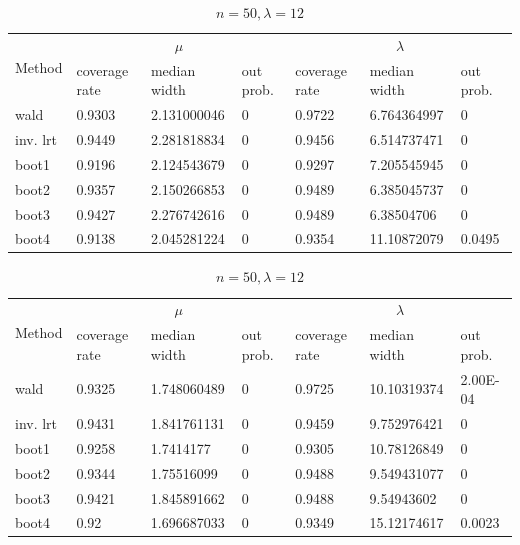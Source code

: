 \documentclass{article}
\begin{document}
       \begin{table}
       \ContinuedFloat
        \begin{subtable}[b]{\textwidth}
		\centering
		\begin{tabular}{l|lll|lll}
		\toprule
        \multirow{2}{*}{Method} & \multicolumn{3}{c|}{$\mu$}      & \multicolumn{3}{c}{$\lambda$}  \\ 
                           & coverage rate & median width & out prob. & coverage rate & median width & out prob. \\
                           \midrule
wald      & 0.9303	&2.131000046	&0 &0.9722	&6.764364997&	0     \\
inv. lrt  & 0.9449	&2.281818834	&0 &0.9456	&6.514737471&	0     \\
boot1     & 0.9196	&2.124543679	&0 &0.9297	&7.205545945&	0     \\
boot2     & 0.9357	&2.150266853	&0 &0.9489	&6.385045737&	0     \\
boot3     & 0.9427	&2.276742616	&0 &0.9489	&6.38504706	&   0     \\
boot4     & 0.9138	&2.045281224	&0 &0.9354	&11.10872079&	0.0495\\
       \bottomrule
       \end{tabular}
       \caption{$n = 50, \lambda = 8$}
       \label{50_8}
       \end{subtable}%

        \begin{subtable}[b]{\textwidth}
		\centering
		\begin{tabular}{l|lll|lll}
		\toprule
        \multirow{2}{*}{Method} & \multicolumn{3}{c|}{$\mu$}      & \multicolumn{3}{c}{$\lambda$}  \\ 
                           & coverage rate & median width & out prob. & coverage rate & median width & out prob. \\
                           \midrule
wald      & 0.9325	&1.748060489	&0 & 0.9725	&10.10319374    &	2.00E-04\\
inv. lrt  & 0.9431	&1.841761131	&0 & 0.9459	&9.752976421    &	0       \\
boot1     & 0.9258	&1.7414177	    &0 & 0.9305	&10.78126849    &	0       \\  
boot2     & 0.9344	&1.75516099	    &0 & 0.9488	&9.549431077    &	0       \\  
boot3     & 0.9421	&1.845891662	&0 & 0.9488	&9.54943602	    &   0       \\  
boot4     & 0.92	&1.696687033	&0 & 0.9349	&15.12174617    &	0.0023  \\
       \bottomrule
       \end{tabular}
       \caption{$n = 50, \lambda = 12$}
       \label{50_12}
       \end{subtable}%


\end{table}
\end{document}
